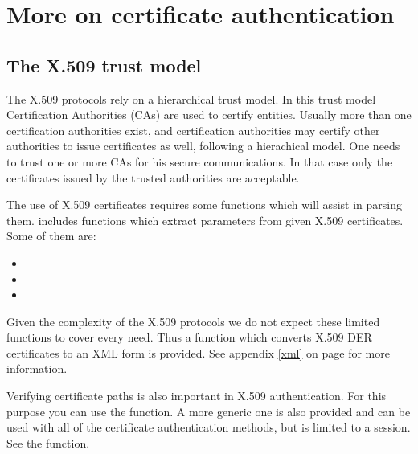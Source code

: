 \chapter{More on certificate authentication}

\section{The X.509 trust model}
\label{x509:trust}

The X.509 protocols rely on a hierarchical trust model. In this trust model
Certification Authorities (CAs) are used to certify entities.
Usually more than one certification authorities exist, and certification
authorities may certify other authorities to issue certificates as well,
following a hierachical model. 
One needs to trust one or more CAs for his secure
communications. In that case only the certificates issued by the trusted
authorities are acceptable. 

\par The use of X.509 certificates requires some functions which will 
assist in parsing them. \gnutls{} includes functions which extract 
parameters from given X.509 certificates. Some of them are:
\begin{itemize}
\item {}
\item {}
\item {}
\end{itemize}

Given the complexity of the X.509 protocols we do not expect these limited 
functions to cover every need. Thus a function which converts X.509 DER certificates
to an XML form is provided. See appendix \ref{xml} on page \pageref{xml} for
more information.


\par
Verifying certificate paths is also important in X.509 authentication.
For this purpose you can use the
function. A more generic one is also provided and can be used with all
of the certificate authentication methods, but is limited to a session. See the
function.


